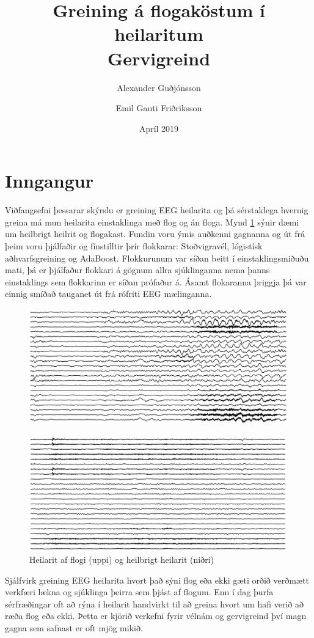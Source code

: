 \documentclass[11pt]{article}
\title{Greining á flogaköstum í heilaritum\\ \Large{ Gervigreind}}
\author{Alexander Guðjónsson \and Emil Gauti Friðriksson }
\date{\vspace{-1ex}Apríl 2019}
\begin{document}
\maketitle
\section{Inngangur}
Viðfangsefni þessarar skýrslu er greining EEG heilarita og þá sérstaklega hvernig greina má mun heilarita einstaklinga með flog og án floga. Mynd \ref{fig:flog} sýnir dæmi um heilbrigt heilrit og flogakast. Fundin voru ýmis auðkenni gagnanna og út frá þeim voru þjálfaðir og fínstilltir þrír flokkarar: Stoðvigravél, lógistísk aðhvarfsgreining og AdaBoost. Flokkurunum var síðan beitt í einstaklingsmiðuðu mati, þá er þjálfaður flokkari á gögnum allra sjúklinganna nema þanns einstaklings sem flokkarinn er síðan prófaður á. Ásamt flokaranna þriggja þá var einnig smíðað tauganet út frá rófriti EEG mælinganna.\\
\begin{figure}[H]
    \centering
    \includegraphics[height=50mm]{flog.PNG}
    \label{fig:flog}
\end{figure}
\begin{figure}[H]
    \centering
    \includegraphics[height=50mm]{ekkiFlog.PNG}
    \caption{Heilarit af flogi (uppi) og heilbrigt heilarit (niðri)}
    \label{fig:ekkiFlog}
\end{figure}


Sjálfvirk greining EEG heilarita hvort það sýni flog eða ekki gæti orðið verðmætt verkfæri lækna og sjúklinga þeirra sem þjást af flogum. Enn í dag þurfa sérfræðingar oft að rýna í heilarit handvirkt til að greina hvort um hafi verið að ræða flog eða ekki. Þetta er kjörið verkefni fyrir vélnám og gervigreind því magn gagna sem safnast er oft mjög mikið.
\end{document}
